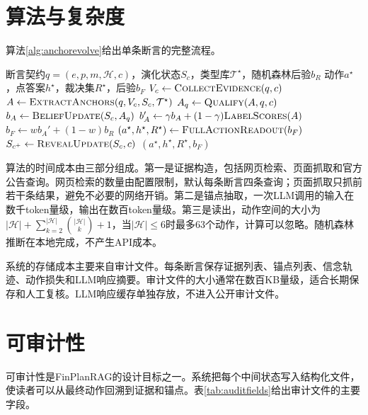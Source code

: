 \section{算法与复杂度}

算法\ref{alg:anchorevolve}给出单条断言的完整流程。

\begin{algorithm}[H]
\caption{AnchorEvolve单条断言的证据构造、锚点演化与全动作裁决}
\label{alg:anchorevolve}
\begin{algorithmic}[1]
\Require 断言契约$q=(e,p,m,\mathcal H,c)$，演化状态$S_c$，类型库$\mathcal T^\star$，随机森林后验$b_R$
\Ensure 动作$a^\star$，点答案$h^\star$，裁决集$R^\star$，后验$b_F$
\State $V_c\gets\textsc{CollectEvidence}(q,c)$ 
\State $A\gets\textsc{ExtractAnchors}(q,V_c,S_c,\mathcal T^\star)$ 
\State $A_q\gets\textsc{Qualify}(A,q,c)$ 
\State $b_A\gets\textsc{BeliefUpdate}(S_c,A_q)$
\State $b_A'\gets\gamma b_A+(1-\gamma)\textsc{LabelScores}(A)$
\State $b_F\gets w b_A'+(1-w)b_R$
\State $(a^\star,h^\star,R^\star)\gets\textsc{FullActionReadout}(b_F)$
\State $S_{c^+}\gets\textsc{RevealUpdate}(S_c,c)$ 
\State \Return $(a^\star,h^\star,R^\star,b_F)$
\end{algorithmic}
\end{algorithm}

算法的时间成本由三部分组成。第一是证据构造，包括网页检索、页面抓取和官方公告查询。网页检索的数量由配置限制，默认每条断言四条查询；页面抓取只抓前若干条结果，避免不必要的网络开销。第二是锚点抽取，一次LLM调用的输入在数千token量级，输出在数百token量级。第三是读出，动作空间的大小为$|\mathcal H|+\sum_{k=2}^{|\mathcal H|}\binom{|\mathcal H|}{k}+1$，当$|\mathcal H|\le6$时最多63个动作，计算可以忽略。随机森林推断在本地完成，不产生API成本。

系统的存储成本主要来自审计文件。每条断言保存证据列表、锚点列表、信念轨迹、动作损失和LLM响应摘要。审计文件的大小通常在数百KB量级，适合长期保存和人工复核。LLM响应缓存单独存放，不进入公开审计文件。

\section{可审计性}

可审计性是FinPlanRAG的设计目标之一。系统把每个中间状态写入结构化文件，使读者可以从最终动作回溯到证据和锚点。表\ref{tab:auditfields}给出审计文件的主要字段。

